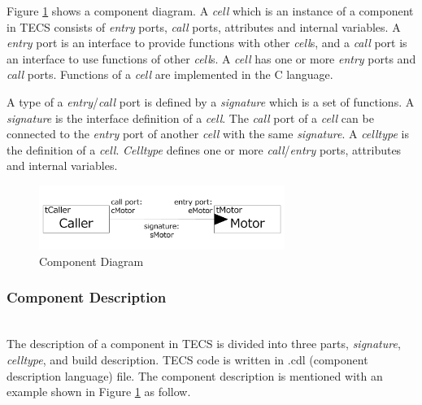\documentclass[conference,compsoc]{IEEEtran}
\begin{document}
Figure \ref{fig:component} shows a component diagram.
A {\it cell} which is an instance of a component in TECS consists of {\it entry} ports, {\it call} ports, attributes and internal variables.
A {\it entry} port is an interface to provide functions with other {\it cell}s, and a {\it call} port is an interface to use functions of other {\it cell}s.
A {\it cell} has one or more {\it entry} ports and {\it call} ports.
Functions of a {\it cell} are implemented in the C language.

A type of a {\it entry}/{\it call} port is defined by a {\it signature} which is a set of functions.
A {\it signature} is the interface definition of a {\it cell}.
The {\it call} port of a {\it cell} can be connected to the {\it entry} port of another {\it cell} with the same {\it signature}.
A {\it celltype} is the definition of a {\it cell}.
{\it Celltype} defines one or more {\it call}/{\it entry} ports, attributes and internal variables.

\begin{figure}[t]
    \centering
    \includegraphics[width=8cm,clip]{figure/component_diagram.pdf}
    \caption{Component Diagram}
    \label{fig:component}
\end{figure}

\subsubsection{Component Description}\mbox{}\\

The description of a component in TECS is divided into three parts, {\it signature}, {\it celltype}, and build description.
TECS code is written in .cdl (component description language) file.
The component description is mentioned with an example shown in Figure \ref{fig:component} as follow.
\end{document}
